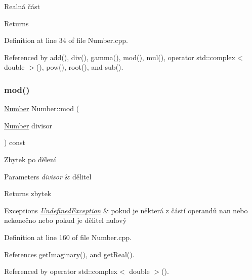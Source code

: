 Realná část \begin{DoxyReturn}{Returns}

\end{DoxyReturn}


Definition at line 34 of file Number.\+cpp.



Referenced by add(), div(), gamma(), mod(), mul(), operator std\+::complex$<$ double $>$(), pow(), root(), and sub().

\mbox{\label{classteam22_1_1_math_1_1_number_a5e459d8c04e890961a71133eb53a15a9}} 
\subsubsection{\texorpdfstring{mod()}{mod()}}
{\footnotesize\ttfamily \hyperlink{classteam22_1_1_math_1_1_number}{Number} Number\+::mod (\begin{DoxyParamCaption}\item[{\hyperlink{classteam22_1_1_math_1_1_number}{Number}}]{divisor }\end{DoxyParamCaption}) const}



Zbytek po dělení 


\begin{DoxyParams}{Parameters}
{\em divisor} & dělitel \\
\hline
\end{DoxyParams}
\begin{DoxyReturn}{Returns}
zbytek 
\end{DoxyReturn}

\begin{DoxyExceptions}{Exceptions}
{\em \hyperlink{classteam22_1_1_math_1_1_undefined_exception}{Undefined\+Exception}} & pokud je některá z částí operandů nan nebo nekonečno nebo pokud je dělitel nulový \\
\hline
\end{DoxyExceptions}


Definition at line 160 of file Number.\+cpp.



References get\+Imaginary(), and get\+Real().



Referenced by operator std\+::complex$<$ double $>$().

